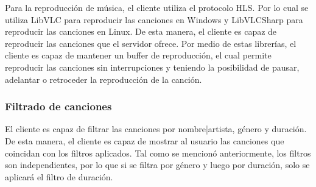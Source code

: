 Para la reproducción de música, el cliente utiliza el protocolo HLS. Por lo cual 
se utiliza LibVLC para reproducir las canciones en Windows y LibVLCSharp para
reproducir las canciones en Linux. De esta manera, el cliente es capaz de
reproducir las canciones que el servidor ofrece. Por medio de estas librerías,
el cliente es capaz de mantener un buffer de reproducción, el cual permite
reproducir las canciones sin interrupciones y teniendo la posibilidad 
de pausar, adelantar o retroceder la reproducción de la canción.

\subsubsection{Filtrado de canciones}

El cliente es capaz de filtrar las canciones por nombre|artista, género y
duración. De esta manera, el cliente es capaz de mostrar al usuario las
canciones que coincidan con los filtros aplicados. Tal como se mencionó
anteriormente, los filtros son independientes, por lo que si se filtra por
género y luego por duración, solo se aplicará el filtro de duración.